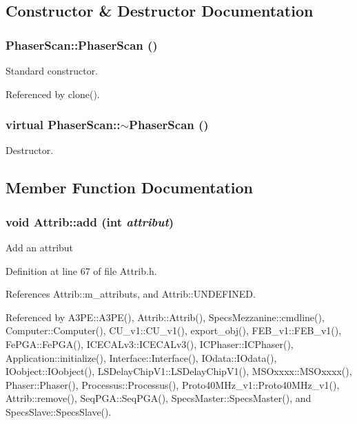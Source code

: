 \subsection{Constructor \& Destructor Documentation}
\hypertarget{classPhaserScan_afba6f21affa3e014fe4019dfd9664672}{
\subsubsection[{PhaserScan}]{\setlength{\rightskip}{0pt plus 5cm}PhaserScan::PhaserScan ()}}
\label{classPhaserScan_afba6f21affa3e014fe4019dfd9664672}


Standard constructor. 

Referenced by clone().\hypertarget{classPhaserScan_a861dfecc0610514a146c300a7458bad5}{
\subsubsection[{$\sim$PhaserScan}]{\setlength{\rightskip}{0pt plus 5cm}virtual PhaserScan::$\sim$PhaserScan ()}}
\label{classPhaserScan_a861dfecc0610514a146c300a7458bad5}


Destructor. 

\subsection{Member Function Documentation}
\hypertarget{classAttrib_a235f773af19c900264a190b00a3b4ad7}{
\subsubsection[{add}]{\setlength{\rightskip}{0pt plus 5cm}void Attrib::add (int {\em attribut})}}
\label{classAttrib_a235f773af19c900264a190b00a3b4ad7}
Add an attribut 

Definition at line 67 of file Attrib.h.

References Attrib::m\_\-attributs, and Attrib::UNDEFINED.

Referenced by A3PE::A3PE(), Attrib::Attrib(), SpecsMezzanine::cmdline(), Computer::Computer(), CU\_\-v1::CU\_\-v1(), export\_\-obj(), FEB\_\-v1::FEB\_\-v1(), FePGA::FePGA(), ICECALv3::ICECALv3(), ICPhaser::ICPhaser(), Application::initialize(), Interface::Interface(), IOdata::IOdata(), IOobject::IOobject(), LSDelayChipV1::LSDelayChipV1(), MSOxxxx::MSOxxxx(), Phaser::Phaser(), Processus::Processus(), Proto40MHz\_\-v1::Proto40MHz\_\-v1(), Attrib::remove(), SeqPGA::SeqPGA(), SpecsMaster::SpecsMaster(), and SpecsSlave::SpecsSlave().



